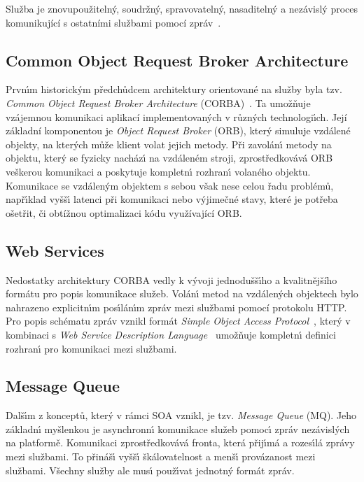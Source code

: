 \begin{definition}
    Služba je znovupoužitelný, soudržný, spravovatelný, nasaditelný a nezávislý proces komunikující
    s ostatními službami pomocí zpráv~\cite{dragoni2017microservices, papazoglou2003service}.
\end{definition}

\subsection{Common Object Request Broker Architecture}\label{sec:corba}

Prvn\'{\i}m historick\'ym předchůdcem architektury orientované na služby
byla tzv. \textit{Common Object Request Broker Architecture}
(\gls{CORBA})~\cite{siegel2000corba}. Ta umožňuje vzájemnou komunikaci aplikací
implementovan\'ych v různ\'ych technologi\'{\i}ch. Její základní komponentou
je \textit{Object Request Broker} (\gls{ORB}), kter\'y simuluje vzdálené objekty,
na kter\'ych může klient volat jejich metody. Při zavolán\'{\i} metody
na objektu, kter\'y se fyzicky nacház\'{\i} na vzdáleném stroji,
zprostředkovává \gls{ORB} veškerou komunikaci a poskytuje kompletn\'{\i} rozhran\'{\i}
volaného objektu. Komunikace se vzdálen\'ym objektem s sebou však nese celou řadu problémů,
např\'{\i}klad vyšš\'{\i} latenci při komunikaci nebo v\'yjimečné stavy, které je potřeba
ošetřit, či obtížnou optimalizaci kódu využívající \gls{ORB}.

\subsection{Web Services}

Nedostatky architektury \gls{CORBA} vedly k vývoji jednodušš\'{\i}ho
a kvalitnějšího formátu pro popis komunikace služeb. Volán\'{\i} metod na vzdálen\'ych objektech
bylo nahrazeno explicitn\'{\i}m pos\'{\i}lán\'{\i}m zpráv mezi službami pomocí protokolu \gls{HTTP}.
Pro popis schématu zpráv vznikl formát \textit{Simple Object Access
Protocol}~\cite{box2000simple}, kter\'y v kombinaci s
\textit{Web Service Description Language}~\cite{christensen2001web}
umožňuje kompletn\'{\i} definici rozhran\'{\i} pro komunikaci mezi službami.

\subsection{Message Queue}

Dalš\'{\i}m z konceptů, kter\'y v rámci \gls{SOA} vznikl, je tzv. \textit{Message Queue} (\gls{MQ}).
Jeho základn\'{\i} myšlenkou je asynchronn\'{\i} komunikace služeb pomoc\'{\i} zpráv nezávisl\'ych
na platformě. Komunikaci zprostředkovává fronta, která přij\'{\i}má a rozes\'{\i}lá
zprávy mezi službami. To přináš\'{\i} vyšš\'{\i} škálovatelnost a menš\'{\i} provázanost
mezi službami. Všechny služby ale mus\'{\i} použ\'{\i}vat jednotn\'y formát zpráv.


